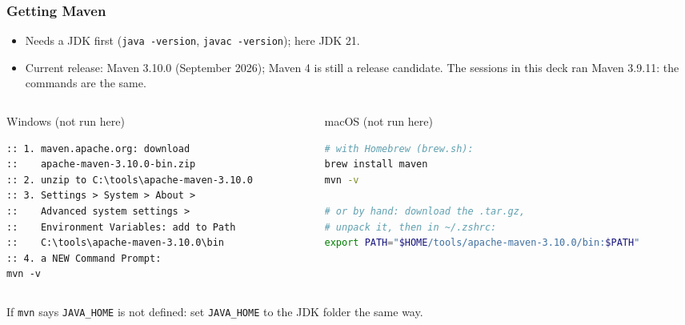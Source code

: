 \documentclass[aspectratio=169,10pt,compress]{beamer}
\begin{document}




\begin{frame}[t,fragile] \frametitle{Getting Maven}
  \begin{itemize}\small
    \item Needs a JDK first (\texttt{java -version}, \texttt{javac -version}); here JDK 21.
    \item Current release: Maven 3.10.0 (September 2026); Maven 4 is still a release candidate. The sessions in this deck ran Maven 3.9.11: the commands are the same.
  \end{itemize}
  \begin{columns}[T]
    \begin{column}{0.48\textwidth}
      \begin{block}{Windows (not run here)}


\begin{lstlisting}[style=codesnippet, language={}, basicstyle=\ttfamily\tiny]
:: 1. maven.apache.org: download
::    apache-maven-3.10.0-bin.zip
:: 2. unzip to C:\tools\apache-maven-3.10.0
:: 3. Settings > System > About >
::    Advanced system settings >
::    Environment Variables: add to Path
::    C:\tools\apache-maven-3.10.0\bin
:: 4. a NEW Command Prompt:
mvn -v
\end{lstlisting}


      \end{block}
    \end{column}
    \begin{column}{0.48\textwidth}
      \begin{block}{macOS (not run here)}


\begin{lstlisting}[style=codesnippet, language=bash, basicstyle=\ttfamily\tiny]
# with Homebrew (brew.sh):
brew install maven
mvn -v

# or by hand: download the .tar.gz,
# unpack it, then in ~/.zshrc:
export PATH="$HOME/tools/apache-maven-3.10.0/bin:$PATH"
\end{lstlisting}


      \end{block}
    \end{column}
  \end{columns}

  \small If \texttt{mvn} says \texttt{JAVA\_HOME} is not defined: set \texttt{JAVA\_HOME} to the JDK folder the same way.
\end{frame}
\end{document}
